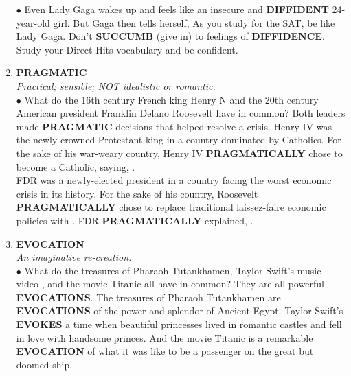 \documentclass{book}
\begin{document}
\begin{enumerate}
$\bullet$ Even Lady Gaga wakes up and feels like an insecure and \textbf{DIFFIDENT} 24-year-old girl. But Gaga then tells herself,  As you study for the SAT, be like Lady
Gaga. Don't \textbf{SUCCUMB} (give in) to feelings of
\textbf{DIFFIDENCE}. Study your Direct Hits vocabulary and
be confident.

\item \textbf{PRAGMATIC}\\ \textit{Practical; sensible; NOT idealistic or romantic.}\\

$\bullet$ What do the 16th century French king Henry N and
the 20th century American president Franklin Delano Roosevelt have in common? Both leaders made \textbf{PRAGMATIC} decisions that helped resolve a crisis. Henry IV was the newly crowned Protestant king in a country dominated by Catholics. For the sake of his war-weary country, Henry IV \textbf{PRAGMATICALLY} chose to become a Catholic, saying, .\\
FDR was a newly-elected president in a country facing
the worst economic crisis in its history. For the sake of
his country, Roosevelt \textbf{PRAGMATICALLY} chose to replace traditional laissez-faire economic policies with
. FDR \textbf{PRAGMATICALLY} explained, .

\item  \textbf{EVOCATION}\\
\textit{An imaginative re-creation.}\\

$ \bullet $ What do the treasures of Pharaoh Tutankhamen,
Taylor Swift's music video , and the
movie Titanic all have in common? They are all
powerful \textbf{EVOCATIONS}. The treasures of Pharaoh
Tutankhamen are \textbf{EVOCATIONS} of the power and
splendor of Ancient Egypt. Taylor Swift's 
\textbf{EVOKES} a time when beautiful princesses lived in
romantic castles and fell in love with handsome
princes. And the movie Titanic is a remarkable
\textbf{EVOCATION} of what it was like to be a passenger on
the great but doomed ship.


\end{enumerate}
\end{document}
